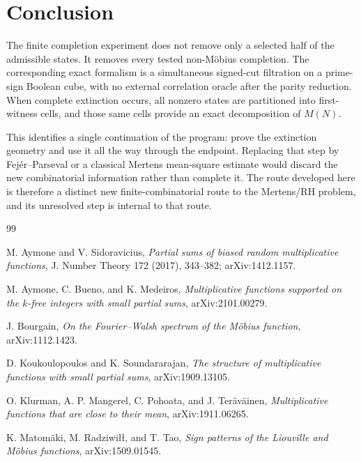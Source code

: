 \documentclass[11pt]{article}
\theoremstyle{definition}
\theoremstyle{remark}
\begin{document}
\section{Conclusion}

The finite completion experiment does not remove only a selected half of the admissible states.  It removes every tested non-M\"obius completion.  The corresponding exact formalism is a simultaneous signed-cut filtration on a prime-sign Boolean cube, with no external correlation oracle after the parity reduction.  When complete extinction occurs, all nonzero states are partitioned into first-witness cells, and those same cells provide an exact decomposition of $M(N)$.

This identifies a single continuation of the program: prove the extinction geometry and use it all the way through the endpoint.  Replacing that step by Fej\'er--Parseval or a classical Mertens mean-square estimate would discard the new combinatorial information rather than complete it.  The route developed here is therefore a distinct new finite-combinatorial route to the Mertens/RH problem, and its unresolved step is internal to that route.

\begin{thebibliography}{99}

M. Aymone and V. Sidoravicius,
\emph{Partial sums of biased random multiplicative functions},
J. Number Theory 172 (2017), 343--382;
arXiv:1412.1157.

M. Aymone, C. Bueno, and K. Medeiros,
\emph{Multiplicative functions supported on the $k$-free integers with small partial sums},
arXiv:2101.00279.

J. Bourgain,
\emph{On the Fourier--Walsh spectrum of the M\"obius function},
arXiv:1112.1423.

D. Koukoulopoulos and K. Soundararajan,
\emph{The structure of multiplicative functions with small partial sums},
arXiv:1909.13105.

O. Klurman, A. P. Mangerel, C. Pohoata, and J. Ter\"av\"ainen,
\emph{Multiplicative functions that are close to their mean},
arXiv:1911.06265.

K. Matom\"aki, M. Radziwi\l\l, and T. Tao,
\emph{Sign patterns of the Liouville and M\"obius functions},
arXiv:1509.01545.

\end{thebibliography}
\end{document}
